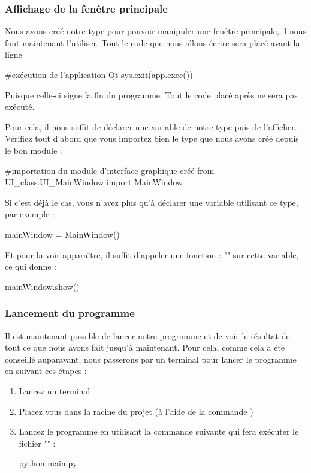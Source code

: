 \documentclass[12pt]{report}    %
\begin{document}
\subsubsection{Affichage de la fenêtre principale}

Nous avons créé notre type  pour pouvoir manipuler une fenêtre principale, il nous faut maintenant l'utiliser.\newline
Tout le code que nous allons écrire sera placé avant la ligne
\begin{pyCode}
    #exécution de l'application Qt
	sys.exit(app.exec())
\end{pyCode}
Puisque celle-ci signe la fin du programme. Tout le code placé après ne sera pas exécuté.\smallSkip

Pour cela, il nous suffit de déclarer une variable de notre type  puis de l'afficher.\newline
Vérifiez tout d'abord que vous importez bien le type que nous avons créé depuis le bon module :
\begin{pyCode}
#importation du module d'interface graphique créé
from UI_class.UI_MainWindow import MainWindow
\end{pyCode}
Si c'est déjà le cas, vous n'avez plus qu'à déclarer une variable utilisant ce type, par exemple :
\begin{pyCode}
mainWindow = MainWindow()
\end{pyCode}
Et pour la voir apparaître, il suffit d'appeler une fonction : "" sur cette variable, ce qui donne :
\begin{pyCode}
mainWindow.show()
\end{pyCode}
\smallSkip


\subsubsection{Lancement du programme}
\label{tag-startProgFromCmdLine}
Il est maintenant possible de lancer notre programme et de voir le résultat de tout ce que nous avons fait jusqu'à maintenant.\newline
Pour cela, comme cela a été conseillé auparavant, nous passerons par un terminal pour lancer le programme en suivant ces étapes :
\begin{enumerate}
\item Lancez un terminal
    
\item Placez vous dans la racine du projet (à l'aide de la commande \textcolor{blue}{})
    
\item Lancez le programme en utilisant la commande suivante qui fera exécuter le fichier "" :
\begin{pyCode}
    python main.py
\end{pyCode}
\end{enumerate}
\end{document}
